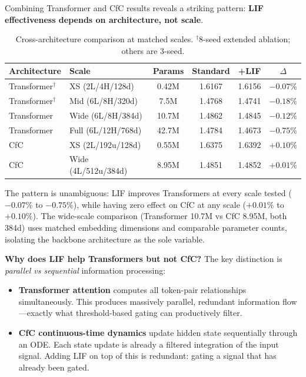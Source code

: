 \documentclass[11pt]{article}
\begin{document}
Combining Transformer and CfC results reveals a striking pattern: \textbf{LIF effectiveness depends on architecture, not scale}.

\begin{table}[h]
\centering
\caption{Cross-architecture comparison at matched scales. $^\dagger$8-seed extended ablation; others are 3-seed.}
\label{tab:cross-arch}
\begin{tabular}{llcccc}
\toprule
\textbf{Architecture} & \textbf{Scale} & \textbf{Params} & \textbf{Standard} & \textbf{+LIF} & \textbf{$\Delta$} \\
\midrule
Transformer$^\dagger$ & XS (2L/4H/128d) & 0.42M & 1.6167 & 1.6156 & $-0.07\%$ \\
Transformer$^\dagger$ & Mid (6L/8H/320d) & 7.5M & 1.4768 & 1.4741 & $-0.18\%$ \\
Transformer & Wide (6L/8H/384d) & 10.7M & 1.4862 & 1.4845 & $-0.12\%$ \\
Transformer & Full (6L/12H/768d) & 42.7M & 1.4784 & 1.4673 & $\mathbf{-0.75\%}$ \\
\midrule
CfC & XS (2L/192u/128d) & 0.55M & 1.6375 & 1.6392 & $+0.10\%$ \\
CfC & Wide (4L/512u/384d) & 8.95M & 1.4851 & 1.4852 & $+0.01\%$ \\
\bottomrule
\end{tabular}
\end{table}

The pattern is unambiguous: LIF improves Transformers at every scale tested ($-0.07\%$ to $-0.75\%$), while having zero effect on CfC at any scale ($+0.01\%$ to $+0.10\%$). The wide-scale comparison (Transformer 10.7M vs CfC 8.95M, both 384d) uses matched embedding dimensions and comparable parameter counts, isolating the backbone architecture as the sole variable.

\textbf{Why does LIF help Transformers but not CfC?} The key distinction is \emph{parallel vs sequential} information processing:
\begin{itemize}
    \item \textbf{Transformer attention} computes all token-pair relationships simultaneously. This produces massively parallel, redundant information flow---exactly what threshold-based gating can productively filter.
    \item \textbf{CfC continuous-time dynamics} update hidden state sequentially through an ODE. Each state update is already a filtered integration of the input signal. Adding LIF on top of this is redundant: gating a signal that has already been gated.
\end{itemize}
\end{document}
